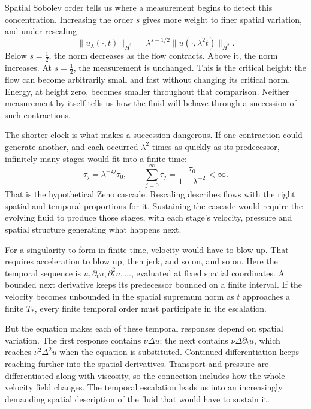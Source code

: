 Spatial Sobolev order tells us where a measurement begins to detect this
concentration. Increasing the order \(s\) gives more weight to finer spatial
variation, and under rescaling
\[
 \|u_\lambda(\cdot,t)\|_{\dot H^s}
 =\lambda^{s-1/2}\|u(\cdot,\lambda^2t)\|_{\dot H^s}.
\]
Below \(s=\tfrac12\), the norm decreases as the flow contracts. Above it,
the norm increases. At \(s=\tfrac12\), the measurement is unchanged.
This is the critical height: the flow can become arbitrarily small and fast
without changing its critical norm. Energy, at height zero, becomes smaller
throughout that comparison. Neither measurement by itself tells us how the
fluid will behave through a succession of such contractions.

The shorter clock is what makes a succession dangerous. If one contraction
could generate another, and each occurred \(\lambda^2\) times as quickly
as its predecessor, infinitely many stages would fit into a finite time:
\[
 \tau_j=\lambda^{-2j}\tau_0,
 \qquad \sum_{j=0}^{\infty}\tau_j
 =\frac{\tau_0}{1-\lambda^{-2}}<\infty.
\]
That is the hypothetical Zeno cascade. Rescaling describes flows with the
right spatial and temporal proportions for it. Sustaining the cascade would
require the evolving fluid to produce those stages, with each stage's
velocity, pressure and spatial structure generating what happens next.

For a singularity to form in finite time, velocity would have to blow up.
That requires acceleration to blow up, then jerk, and so on, and so on.
Here the temporal sequence is \(u,\partial_tu,\partial_t^2u,\ldots\),
evaluated at fixed spatial coordinates. A bounded next derivative keeps its
predecessor bounded on a finite interval. If the velocity becomes unbounded
in the spatial supremum norm as \(t\) approaches a finite \(T_*\), every
finite temporal order must participate in the escalation. 

But the equation makes each of these temporal responses depend on spatial
variation. The first response contains \(\nu\Delta u\); the next contains
\(\nu\Delta\partial_tu\), which reaches \(\nu^2\Delta^2u\) when the
equation is substituted. Continued differentiation keeps reaching further
into the spatial derivatives. Transport and pressure are differentiated
along with viscosity, so the connection includes how the whole velocity
field changes. The temporal escalation leads us into an increasingly
demanding spatial description of the fluid that would have to sustain it.

